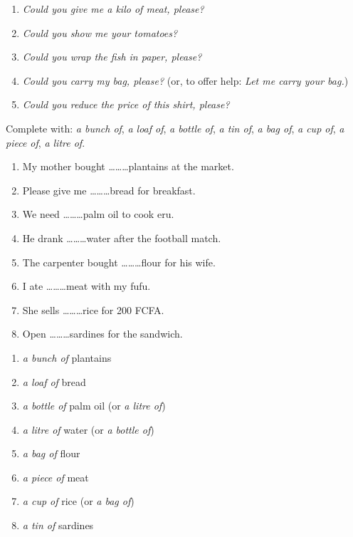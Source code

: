 \documentclass[11pt]{article}
\begin{document}
\begin{corrige}[Exercice 1]
\begin{enumerate}
\item \emph{Could you give me a kilo of meat, please?}
\item \emph{Could you show me your tomatoes?}
\item \emph{Could you wrap the fish in paper, please?}
\item \emph{Could you carry my bag, please?} (or, to offer help: \emph{Let me carry your bag.})
\item \emph{Could you reduce the price of this shirt, please?}
\end{enumerate}
\end{corrige}

\begin{exercice}
Complete with: \emph{a bunch of}, \emph{a loaf of}, \emph{a bottle of}, \emph{a tin of}, \emph{a bag of}, \emph{a cup of}, \emph{a piece of}, \emph{a litre of}.
\begin{enumerate}
\item My mother bought \ldots\ldots\ldots plantains at the market.
\item Please give me \ldots\ldots\ldots bread for breakfast.
\item We need \ldots\ldots\ldots palm oil to cook eru.
\item He drank \ldots\ldots\ldots water after the football match.
\item The carpenter bought \ldots\ldots\ldots flour for his wife.
\item I ate \ldots\ldots\ldots meat with my fufu.
\item She sells \ldots\ldots\ldots rice for 200 FCFA.
\item Open \ldots\ldots\ldots sardines for the sandwich.
\end{enumerate}
\end{exercice}

\begin{corrige}[Exercice 2]
\begin{enumerate}
\item \emph{a bunch of} plantains
\item \emph{a loaf of} bread
\item \emph{a bottle of} palm oil (or \emph{a litre of})
\item \emph{a litre of} water (or \emph{a bottle of})
\item \emph{a bag of} flour
\item \emph{a piece of} meat
\item \emph{a cup of} rice (or \emph{a bag of})
\item \emph{a tin of} sardines
\end{enumerate}
\end{corrige}
\end{document}
